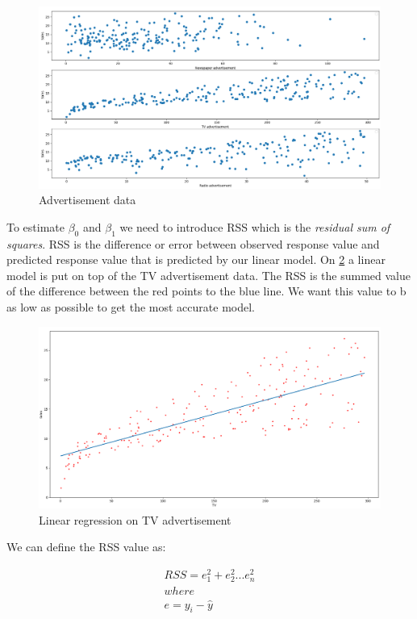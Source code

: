 \begin{figure}[H]
	\centering
	\includegraphics[width=\textwidth]{Img/Advertisement_data.PNG}
	\caption{Advertisement data}
	\label{fig:Advertisement_data}
\end{figure} 

To estimate $\beta_0$ and $\beta_1$ we need to introduce RSS which is the \textit{residual sum of squares}. RSS is the difference or error between observed response value and predicted response value that is predicted by our linear model. On \cref{fig:TV_linear_reg} a linear model is put on top of the TV advertisement data. The RSS is the summed value of the difference between the red points to the blue line. We want this value to b as low as possible to get the most accurate model. 

\begin{figure}[H]
	\centering
	\includegraphics[width=\textwidth]{Img/Regplot_tv.PNG}
	\caption{Linear regression on TV advertisement}
	\label{fig:TV_linear_reg}
\end{figure} 

We can define the RSS value as:


\begin{equation} \label{eq:RSS}
\begin{split}
RSS = e_{1}^{2}+e_{2}^{2}...e_{n}^{2} \\
where \\
e = y_{i}-\hat{y}
\end{split}
\end{equation} 

